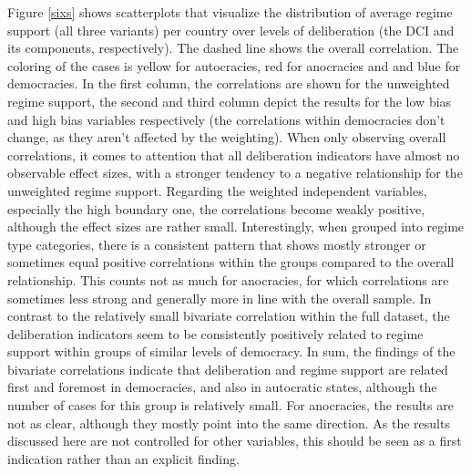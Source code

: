 \documentclass[]{article}
\begin{document}
Figure \ref{sixs} shows scatterplots that visualize the distribution of
average regime support (all three variants) per country over levels of
deliberation (the DCI and its components, respectively). The dashed line
shows the overall correlation. The coloring of the cases is yellow for
autocracies, red for anocracies and and blue for democracies. In the
first column, the correlations are shown for the unweighted regime
support, the second and third column depict the results for the low bias
and high bias variables respectively (the correlations within
democracies don't change, as they aren't affected by the weighting).
When only observing overall correlations, it comes to attention that all
deliberation indicators have almost no observable effect sizes, with a
stronger tendency to a negative relationship for the unweighted regime
support. Regarding the weighted independent variables, especially the
high boundary one, the correlations become weakly positive, although the
effect sizes are rather small. Interestingly, when grouped into regime
type categories, there is a consistent pattern that shows mostly
stronger or sometimes equal positive correlations within the groups
compared to the overall relationship. This counts not as much for
anocracies, for which correlations are sometimes less strong and
generally more in line with the overall sample. In contrast to the
relatively small bivariate correlation within the full dataset, the
deliberation indicators seem to be consistently positively related to
regime support within groups of similar levels of democracy. In sum, the
findings of the bivariate correlations indicate that deliberation and
regime support are related first and foremost in democracies, and also
in autocratic states, although the number of cases for this group is
relatively small. For anocracies, the results are not as clear, although
they mostly point into the same direction. As the results discussed here
are not controlled for other variables, this should be seen as a first
indication rather than an explicit finding.
\end{document}
